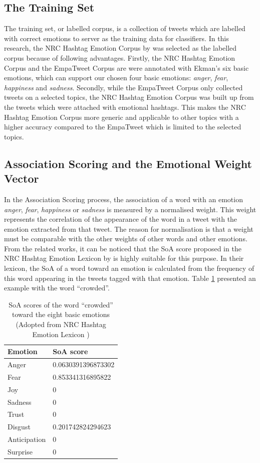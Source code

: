 \subsection{The Training Set}
The training set, or labelled corpus, is a collection of tweets which are labelled with correct emotions to server as the training data for classifiers. In this research, the NRC Hashtag Emotion Corpus by \citet{mohammad2014using} was selected as the labelled corpus because of following advantages. Firstly, the NRC Hashtag Emotion Corpus and the EmpaTweet Corpus are were annotated with Ekman's six basic emotions, which can support our chosen four basic emotions: \textit{anger}, \textit{fear}, \textit{happiness} and \textit{sadness}. Secondly, while the EmpaTweet Corpus only collected tweets on a selected topics, the NRC Hashtag Emotion Corpus was built up from the tweets which were attached with emotional hashtags. This makes the NRC Hashtag Emotion Corpus more generic and applicable to other topics with a higher accuracy compared to the EmpaTweet which is limited to the selected topics.

\subsection{Association Scoring and the Emotional Weight Vector}
In the Association Scoring process, the association of a word with an emotion \textit{anger}, \textit{fear}, \textit{happiness} or \textit{sadness} is measured by a normalised weight. This weight represents the correlation of the appearance of the word in a tweet with the emotion extracted from that tweet. The reason for normalisation is that a weight must be comparable with the other weights of other words and other emotions. From the related works, it can be noticed that the SoA score proposed in the NRC Hashtag Emotion Lexicon by \citet{mohammad2014using} is highly suitable for this purpose. In their lexicon, the SoA of a word toward an emotion is calculated from the frequency of this word appearing in the tweets tagged with that emotion. Table \ref{table:soaOfCrowded} presented an example with the word ``crowded''.

\begin{table}[htb!]
\centering
\caption{SoA scores of the word ``crowded'' toward the eight basic emotions (Adopted from NRC Hashtag Emotion Lexicon \citep{mohammad2014using})}
\label{table:soaOfCrowded}
\begin{tabular}{|l|l|}
\hline
\textbf{Emotion} & \textbf{SoA score} \\ \hline \hline
Anger & 0.0630391396873302 \\ \hline
Fear & 0.853341316895822 \\ \hline
Joy & 0 \\ \hline
Sadness & 0 \\ \hline
Trust & 0 \\ \hline
Disgust & 0.201742824294623 \\ \hline
Anticipation & 0 \\ \hline
Surprise & 0 \\ \hline
\end{tabular}
\end{table}

